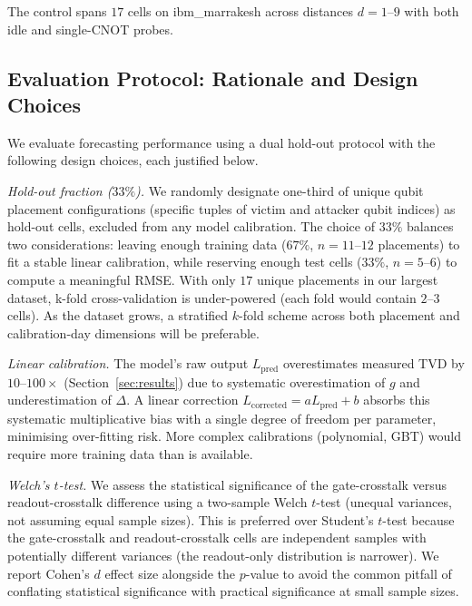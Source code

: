 \documentclass[ASNA,twocolumn]{USG}
\begin{document}
The control spans $17$ cells on ibm\_marrakesh across distances $d = 1$--$9$ with both idle and single-CNOT probes.

\subsection{Evaluation Protocol: Rationale and Design Choices}

We evaluate forecasting performance using a dual hold-out protocol with the following design choices, each justified below.

\textit{Hold-out fraction ($33\%$).} We randomly designate one-third of unique qubit placement configurations (specific tuples of victim and attacker qubit indices) as hold-out cells, excluded from any model calibration. The choice of $33\%$ balances two considerations: leaving enough training data ($67\%$, $n=11$--$12$ placements) to fit a stable linear calibration, while reserving enough test cells ($33\%$, $n=5$--$6$) to compute a meaningful RMSE. With only $17$ unique placements in our largest dataset, k-fold cross-validation is under-powered (each fold would contain $2$--$3$ cells). As the dataset grows, a stratified $k$-fold scheme across both placement and calibration-day dimensions will be preferable.

\textit{Linear calibration.} The model's raw output $L_{\mathrm{pred}}$ overestimates measured TVD by $10$--$100\times$ (Section~\ref{sec:results}) due to systematic overestimation of $g$ and underestimation of $\Delta$. A linear correction $L_{\mathrm{corrected}} = a L_{\mathrm{pred}} + b$ absorbs this systematic multiplicative bias with a single degree of freedom per parameter, minimising over-fitting risk. More complex calibrations (polynomial, GBT) would require more training data than is available.

\textit{Welch's $t$-test.} We assess the statistical significance of the gate-crosstalk versus readout-crosstalk difference using a two-sample Welch $t$-test (unequal variances, not assuming equal sample sizes). This is preferred over Student's $t$-test because the gate-crosstalk and readout-crosstalk cells are independent samples with potentially different variances (the readout-only distribution is narrower). We report Cohen's $d$ effect size alongside the $p$-value to avoid the common pitfall of conflating statistical significance with practical significance at small sample sizes.
\end{document}
